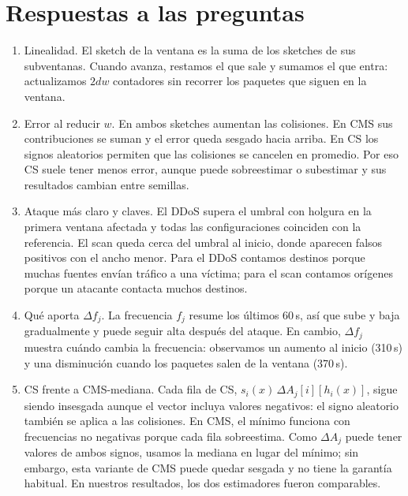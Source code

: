 \documentclass[11pt]{article}
\begin{document}
\section{Respuestas a las preguntas}

\begin{enumerate}[leftmargin=*]
\item Linealidad. El sketch de la ventana es la suma de los sketches de sus subventanas. Cuando avanza, restamos el que sale y sumamos el que entra: actualizamos $2dw$ contadores sin recorrer los paquetes que siguen en la ventana.

\item Error al reducir $w$. En ambos sketches aumentan las colisiones. En CMS sus contribuciones se suman y el error queda sesgado hacia arriba. En CS los signos aleatorios permiten que las colisiones se cancelen en promedio. Por eso CS suele tener menos error, aunque puede sobreestimar o subestimar y sus resultados cambian entre semillas.

\item Ataque más claro y claves. El DDoS supera el umbral con holgura en la primera ventana afectada y todas las configuraciones coinciden con la referencia. El scan queda cerca del umbral al inicio, donde aparecen falsos positivos con el ancho menor. Para el DDoS contamos destinos porque muchas fuentes envían tráfico a una víctima; para el scan contamos orígenes porque un atacante contacta muchos destinos.

\item Qué aporta $\Delta f_j$. La frecuencia $f_j$ resume los últimos 60\,s, así que sube y baja gradualmente y puede seguir alta después del ataque. En cambio, $\Delta f_j$ muestra cuándo cambia la frecuencia: observamos un aumento al inicio (310\,s) y una disminución cuando los paquetes salen de la ventana (370\,s).

\item CS frente a CMS-mediana. Cada fila de CS, $s_i(x)\,\Delta A_j[i][h_i(x)]$, sigue siendo insesgada aunque el vector incluya valores negativos: el signo aleatorio también se aplica a las colisiones. En CMS, el mínimo funciona con frecuencias no negativas porque cada fila sobreestima. Como $\Delta A_j$ puede tener valores de ambos signos, usamos la mediana en lugar del mínimo; sin embargo, esta variante de CMS puede quedar sesgada y no tiene la garantía habitual. En nuestros resultados, los dos estimadores fueron comparables.
\end{enumerate}
\end{document}
